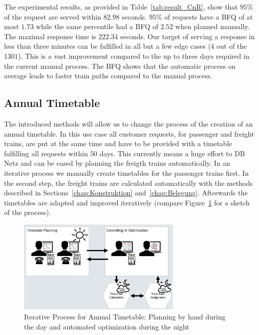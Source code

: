 The experimental results, as provided in Table~\ref{tab:result_CnR}, show that $95\%$ of the request are served within $82.98$ seconds. $95\%$ of requests have a BFQ of at most $1.73$ while the same percentile had a BFQ of $2.52$ when planned manually. The maximal response time is $222.34$ seconds. Our target of serving a response in less than three minutes can be fulfilled in all but a few edge cases ($4$ out of the $1301$). This is a vast improvement compared to the up to three days required in the current manual process. The BFQ shows that the automatic process on average leads to faster train paths compared to the manual process.

\subsection{Annual Timetable}
\label{chap:Netzfahrplan}

The introduced methods will allow us to change the process of the creation of an annual timetable. In this use case all customer requests, for passenger and freight trains, are put at the same time and have to be provided with a timetable fulfilling all requests within $50$ days. This currently means a huge effort to DB Netz and can be eased by planning the freigth trains automatically. In an iterative process we manually create timetables for the passenger trains first. In the second step, the freight trains are calculated automatically with the methods described in Sections~\ref{chap:Konstruktion} and~\ref{chap:Belegung}. Afterwards the timetables are adapted and improved iteratively (compare Figure~\ref{fig:annual_planning} for a sketch of the process).

\begin{figure}[htb]
	\centering
	\includegraphics[width=0.7\textwidth]{Bilder/annual_planning.jpg}
	\caption{Iterative Process for Annual Timetable: Planning by hand during the day and automated optimization during the night}
	\label{fig:annual_planning}
\end{figure}

